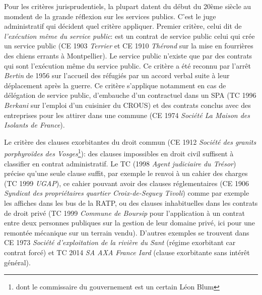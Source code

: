\documentclass[math]{cours}
\begin{document}
Pour les critères jurisprudentiels, la plupart datent du début du 20ème siècle au momdent de la grande réflexion sur les services publics.
C'est le juge administratif qui décident quel critère appliquer.
Premier critère, celui dit de \emph{l'exécution même du service public}: est un contrat de service public celui qui crée un service public (CE 1903 \emph{Terrier} et CE 1910 \emph{Thérond} sur la mise en fourrières des chiens errants à Montpellier).
Le service public n'existe que par des contrats qui sont l'exécution même du service public.
Ce critère a été reconnu par l'arrêt \emph{Bertin} de 1956 sur l'accueil des réfugiés par un accord verbal suite à leur déplacement après la guerre.
Ce critère s'applique notamment en cas de délégation de service public, d'embauche d'un contractuel dans un SPA (TC 1996 \emph{Berkani} sur l'emploi d'un cuisinier du CROUS) et des contrats conclus avec des entreprises pour les attirer dans une commune (CE 1974 \emph{Société La Maison des Isolants de France}).

Le critère des clauses exorbitantes du droit commun (CE 1912 \emph{Société des granits porphyroïdes des Vosges}\footnote{dont le commissaire du gouvernement est un certain Léon Blum}): des clauses impossibles en droit civil suffisent à
classifier en contrat administratif.
Le TC (1998 \emph{Agent judiciaire du Trésor}) précise qu'une seule clause suffit, par exemple le renvoi à un cahier des charges (TC 1999 \emph{UGAP}), ce cahier pouvant avoir des clauses réglementaires (CE 1906 \emph{Syndicat des propriétaires quartier Croix-de-Seguey Tivoli}) comme par exemple les affiches dans les bus de la RATP, ou des clauses inhabituelles dans les contrats de droit privé (TC 1999 \emph{Commune de Boursip} pour l'application à un contrat entre deux personnes publiques sur la gestion de leur domaine privé, ici pour une remontée mécanique sur un terrain vendu).
D'autres exemples se trouvent dans CE 1973 \emph{Société d'exploitation de la rivière du Sant} (régime exorbitant car contrat forcé) et TC 2014 \emph{SA AXA France Iard} (clause exorbitante sans intérêt général).
\end{document}
